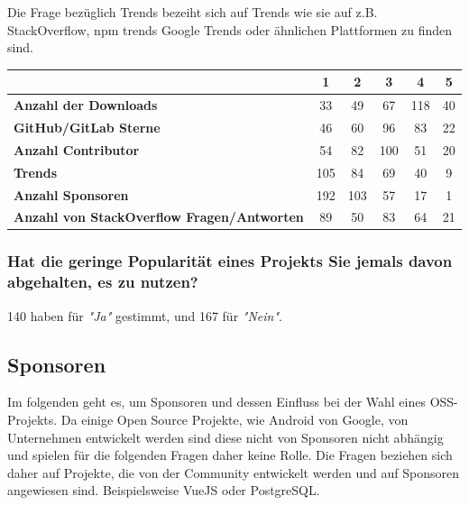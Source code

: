 Die Frage bezüglich Trends bezeiht sich auf Trends wie sie auf z.B. StackOverflow, npm trends Google Trends oder ähnlichen
Plattformen zu finden sind.

\begin{table}[h]
    \begin{tabular}{l|c|c|c|c|c|}
                                                           & \textbf{1} & \textbf{2} & \textbf{3} & \textbf{4} & \textbf{5} \\ \hline
        \textbf{Anzahl der Downloads}                      & 33         & 49         & 67         & 118        & 40         \\ \hline
        \textbf{GitHub/GitLab Sterne}                      & 46         & 60         & 96         & 83         & 22         \\ \hline
        \textbf{Anzahl Contributor}                        & 54         & 82         & 100        & 51         & 20         \\ \hline
        \textbf{Trends}                                    & 105        & 84         & 69         & 40         & 9          \\ \hline
        \textbf{Anzahl Sponsoren}                          & 192        & 103        & 57         & 17         & 1          \\ \hline
        \textbf{Anzahl von StackOverflow Fragen/Antworten} & 89         & 50         & 83         & 64         & 21         \\ \hline
    \end{tabular}%
\end{table}


\subsubsection*{Hat die geringe Popularität eines Projekts Sie jemals davon abgehalten, es zu nutzen?}
140 haben für \textit{"Ja"} gestimmt, und 167 für \textit{"Nein"}.


\subsection{Sponsoren}
Im folgenden geht es, um Sponsoren und dessen Einfluss bei der Wahl eines OSS-Projekts.
Da einige Open Source Projekte, wie Android von Google, von Unternehmen entwickelt werden sind diese nicht von
Sponsoren nicht abhängig und spielen für die folgenden Fragen daher keine Rolle.
Die Fragen beziehen sich daher auf Projekte, die von der Community entwickelt werden und auf
Sponsoren angewiesen sind. Beispielsweise VueJS oder PostgreSQL.

